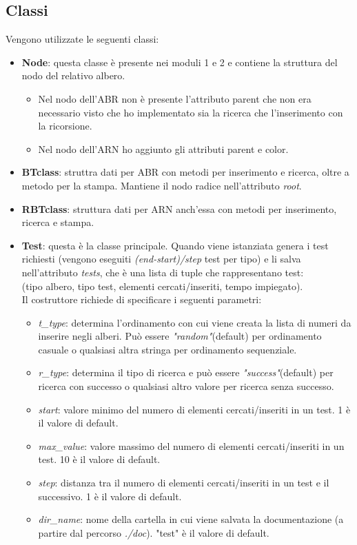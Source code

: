 \documentclass{article}
\begin{document}
\subsection{Classi}
Vengono utilizzate le seguenti classi:
\begin{itemize}
    \item \textbf{Node}: questa classe è presente nei moduli 1 e 2 e contiene la struttura del nodo del relativo albero.
    \begin{itemize}
        \item Nel nodo dell'ABR non è presente l'attributo parent che non era necessario visto che ho implementato sia la ricerca che l'inserimento con la ricorsione. 
        \item Nel nodo dell'ARN ho aggiunto gli attributi parent e color.
    \end{itemize}
    \item \textbf{BTclass}: struttra dati per ABR con metodi per inserimento e ricerca, oltre a metodo per la stampa. Mantiene il nodo radice nell'attributo \emph{root}.
    \item \textbf{RBTclass}: struttura dati per ARN anch'essa con metodi per inserimento, ricerca e stampa.
    \item \textbf{Test}: questa è la classe principale. Quando viene istanziata genera i test richiesti (vengono eseguiti \emph{(end-start)/step} test per tipo) e li salva nell'attributo \emph{tests}, che è una lista di tuple che rappresentano test:\\(tipo albero, tipo test, elementi cercati/inseriti, tempo impiegato).\\Il costruttore richiede di specificare i seguenti parametri:
    \begin{itemize}
        \item \emph{t\_type}: determina l'ordinamento con cui viene creata la lista di numeri da inserire negli alberi. Può essere \emph{"random"}(default) per ordinamento casuale o qualsiasi altra stringa per ordinamento sequenziale.
        \item \emph{r\_type}: determina il tipo di ricerca e può essere \emph{"success"}(default) per ricerca con successo o qualsiasi altro valore per ricerca senza successo.
        \item \emph{start}: valore minimo del numero di elementi cercati/inseriti in un test. 1 è il valore di default.
        \item \emph{max\_value}: valore massimo del numero di elementi cercati/inseriti in un test. 10 è il valore di default.
        \item \emph{step}: distanza tra il numero di elementi cercati/inseriti in un test e il successivo. 1 è il valore di default.
        \item \emph{dir\_name}: nome della cartella in cui viene salvata la documentazione (a partire dal percorso \emph{./doc}). "test" è il valore di default.
    \end{itemize}
\end{itemize}
\end{document}
